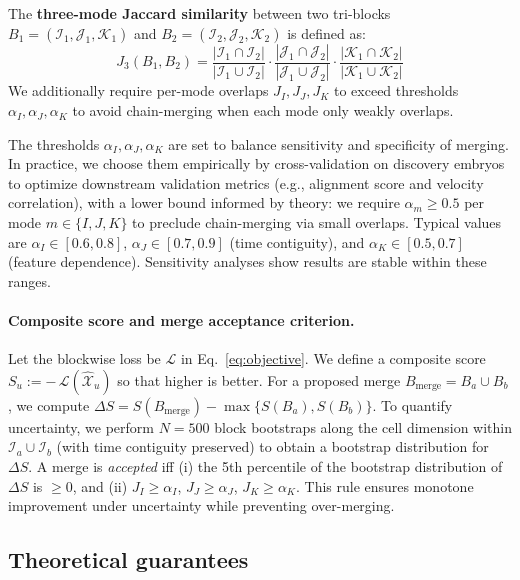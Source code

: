 \documentclass[unnumsec,webpdf,modern,large,namedate]{oup-authoring-template}%
\theoremstyle{thmstyleone}\newtheorem{theorem}{Theorem}
\theoremstyle{thmstyletwo}\newtheorem{example}{Example}
\theoremstyle{thmstylethree}\newtheorem{definition}{Definition}
\begin{document}
The \textbf{three-mode Jaccard similarity} between two tri-blocks $B_1 = (\mathcal{I}_1, \mathcal{J}_1, \mathcal{K}_1)$ and $B_2 = (\mathcal{I}_2, \mathcal{J}_2, \mathcal{K}_2)$ is defined as:
\begin{equation}
J_3(B_1,B_2) = \frac{|\mathcal{I}_1\cap \mathcal{I}_2|}{|\mathcal{I}_1\cup \mathcal{I}_2|} \cdot \frac{|\mathcal{J}_1\cap \mathcal{J}_2|}{|\mathcal{J}_1\cup \mathcal{J}_2|} \cdot \frac{|\mathcal{K}_1\cap \mathcal{K}_2|}{|\mathcal{K}_1\cup \mathcal{K}_2|}
\label{eq:trimode_jaccard}
\end{equation}
We additionally require per-mode overlaps $J_I,J_J,J_K$ to exceed thresholds $\alpha_I,\alpha_J,\alpha_K$ to avoid chain-merging when each mode only weakly overlaps.

The thresholds $\alpha_I,\alpha_J,\alpha_K$ are set to balance sensitivity and specificity of merging. In practice, we choose them empirically by cross-validation on discovery embryos to optimize downstream validation metrics (e.g., alignment score and velocity correlation), with a lower bound informed by theory: we require $\alpha_m\geq 0.5$ per mode $m\in\{I,J,K\}$ to preclude chain-merging via small overlaps. Typical values are $\alpha_I\in[0.6,0.8]$, $\alpha_J\in[0.7,0.9]$ (time contiguity), and $\alpha_K\in[0.5,0.7]$ (feature dependence). Sensitivity analyses show results are stable within these ranges.

\paragraph{Composite score and merge acceptance criterion.} Let the blockwise loss be $\mathcal{L}$ in Eq.~\eqref{eq:objective}. We define a composite score $S_u := -\,\mathcal{L}(\hat{\mathcal{X}}_u)$ so that higher is better. For a proposed merge $B_{\mathrm{merge}} = B_a \cup B_b$, we compute $\Delta S = S(B_{\mathrm{merge}}) - \max\{S(B_a), S(B_b)\}$. To quantify uncertainty, we perform $N=500$ block bootstraps along the cell dimension within $\mathcal{I}_a\cup\mathcal{I}_b$ (with time contiguity preserved) to obtain a bootstrap distribution for $\Delta S$. A merge is \emph{accepted} iff (i) the 5th percentile of the bootstrap distribution of $\Delta S$ is $\ge 0$, and (ii) $J_I\ge\alpha_I$, $J_J\ge\alpha_J$, $J_K\ge\alpha_K$. This rule ensures monotone improvement under uncertainty while preventing over-merging.

\subsection{Theoretical guarantees}
\end{document}
